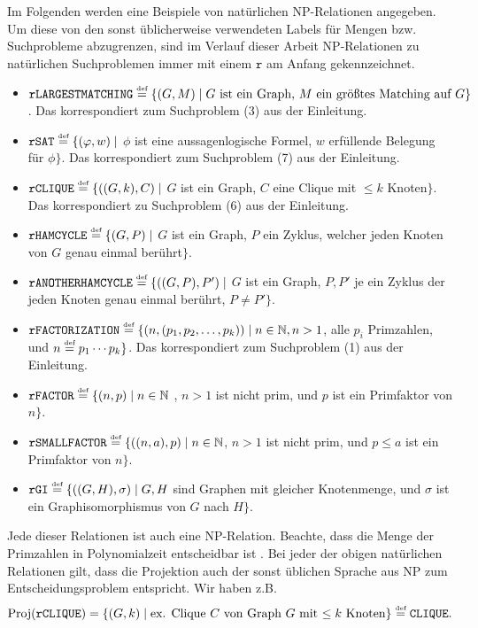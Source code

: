 Im Folgenden werden eine Beispiele von natürlichen NP-Relationen angegeben. Um diese von den sonst üblicherweise verwendeten Labels für Mengen bzw. Suchprobleme abzugrenzen, sind im Verlauf dieser Arbeit NP-Relationen zu natürlichen Suchproblemen immer mit einem $\mathtt{r}$ am Anfang gekennzeichnet.
\label{page:natural-searchproblems}
\begin{itemize}[midpenalty=0]
\item $\mathtt{rLARGESTMATCHING} \stackrel{\text{{\normalfont\tiny def}}}{=} \{ (G, M) \mid \text{$G$ ist ein Graph, $M$ ein größtes Matching auf $G$} \}$. Das korrespondiert zum Suchproblem (3) aus der Einleitung.
\item $\mathtt{rSAT} \stackrel{\text{{\normalfont\tiny def}}}{=} \{ (\varphi, w) \mid $ $\phi$ ist eine aussagenlogische Formel, $w$ erfüllende Belegung für $\phi$$\}$. Das korrespondiert zum Suchproblem (7) aus der Einleitung.
\item $\mathtt{rCLIQUE} \stackrel{\text{{\normalfont\tiny def}}}{=} \{ ((G, k), C) \mid $ $G$ ist ein Graph, $C$ eine Clique mit $\leq k$ Knoten$\}$. Das korrespondiert zu Suchproblem (6) aus der Einleitung.
\item $\mathtt{rHAMCYCLE} \stackrel{\text{{\normalfont\tiny def}}}{=} \{ (G, P) \mid $ $G$ ist ein Graph, $P$ ein Zyklus, welcher jeden Knoten von $G$ genau einmal berührt$\}$.
\item $\mathtt{rANOTHERHAMCYCLE} \stackrel{\text{{\normalfont\tiny def}}}{=} \{ ((G, P), P') \mid $ $G$ ist ein Graph, $P, P'$ je ein Zyklus der jeden Knoten genau einmal berührt, $P\neq P' \}$.
\item $\mathtt{rFACTORIZATION} \stackrel{\text{{\normalfont\tiny def}}}{=} \{ (n, (p_1,p_2,\dots, p_k)) \mid n\in\mathbb N, n>1$, alle $p_i$ Primzahlen, und $n\stackrel{\text{{\normalfont\tiny def}}}{=} p_1\cdots p_k \}$. Das korrespondiert zum Suchproblem (1) aus der Einleitung.
\item $\mathtt{rFACTOR} \stackrel{\text{{\normalfont\tiny def}}}{=} \{ (n, p) \mid n\in\mathbb N$ , $n>1$ ist nicht prim, und $p$ ist ein Primfaktor von $n\}$.
\item $\mathtt{rSMALLFACTOR} \stackrel{\text{{\normalfont\tiny def}}}{=} \{ ((n, a), p) \mid n\in\mathbb N$, $n>1$ ist nicht prim, und $p\leq a$ ist ein Primfaktor von $n$$\}$.
\item $\mathtt{rGI} \stackrel{\text{{\normalfont\tiny def}}}{=} \{ ((G, H), \sigma) \mid G, H$ sind Graphen mit gleicher Knotenmenge, und $\sigma$ ist ein Graphisomorphismus von $G$ nach $H\}$.
\end{itemize}
Jede dieser Relationen ist auch eine NP-Relation. Beachte, dass die Menge der Primzahlen in Polynomialzeit entscheidbar ist \parencite{agrawal_primes_2004}.
Bei jeder der obigen natürlichen Relationen gilt, dass die Projektion auch der sonst üblichen Sprache aus NP zum Entscheidungsproblem entspricht. Wir haben z.B.
\[ \operatorname{Proj}(\mathtt{rCLIQUE}) = \{ (G, k) \mid \text{ex. Clique $C$ von Graph $G$ mit $\leq k$ Knoten} \} \stackrel{\text{{\normalfont\tiny def}}}{=} \mathtt{CLIQUE}. \]

